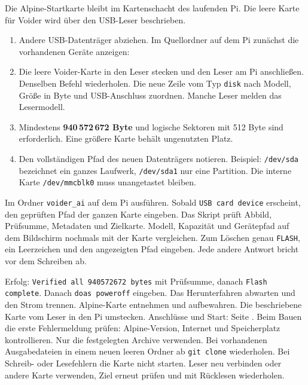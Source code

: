 Die Alpine-Startkarte bleibt im Kartenschacht des laufenden Pi. Die leere Karte für Voider wird über den USB-Leser beschrieben.
\begin{enumerate}
\item Andere USB-Datenträger abziehen. Im Quellordner auf dem Pi zunächst die vorhandenen Geräte anzeigen:
\listCards
\item Die leere Voider-Karte in den Leser stecken und den Leser am Pi anschließen. Denselben Befehl wiederholen. Die neue Zeile vom Typ \texttt{disk} nach Modell, Größe in Byte und USB-Anschluss zuordnen. Manche Leser melden das Lesermodell.
\item Mindestens \textbf{940\,572\,672 Byte} und logische Sektoren mit 512 Byte sind erforderlich. Eine größere Karte behält ungenutzten Platz.
\item Den vollständigen Pfad des neuen Datenträgers notieren. Beispiel: \texttt{/dev/sda} bezeichnet ein ganzes Laufwerk, \texttt{/dev/sda1} nur eine Partition. Die interne Karte \texttt{/dev/mmcblk0} muss unangetastet bleiben.
\end{enumerate}

Im Ordner \texttt{voider\_ai} auf dem Pi ausführen. Sobald \texttt{USB card device} erscheint, den geprüften Pfad der ganzen Karte eingeben.
\flashCommands
Das Skript prüft Abbild, Prüfsumme, Metadaten und Zielkarte. Modell, Kapazität und Gerätepfad auf dem Bildschirm nochmals mit der Karte vergleichen. Zum Löschen genau \texttt{FLASH}, ein Leerzeichen und den angezeigten Pfad eingeben. Jede andere Antwort bricht vor dem Schreiben ab.

Erfolg: \texttt{Verified all 940572672 bytes} mit Prüfsumme, danach \texttt{Flash complete}. Danach \texttt{doas poweroff} eingeben. Das Herunterfahren abwarten und den Strom trennen. Alpine-Karte entnehmen und aufbewahren. Die beschriebene Karte vom Leser in den Pi umstecken. Anschlüsse und Start: Seite \pageref{de:wire}.
Beim Bauen die erste Fehlermeldung prüfen: Alpine-Version, Internet und Speicherplatz kontrollieren. Nur die festgelegten Archive verwenden. Bei vorhandenen Ausgabedateien in einem neuen leeren Ordner ab \texttt{git clone} wiederholen. Bei Schreib- oder Lesefehlern die Karte nicht starten. Leser neu verbinden oder andere Karte verwenden, Ziel erneut prüfen und mit Rücklesen wiederholen.

